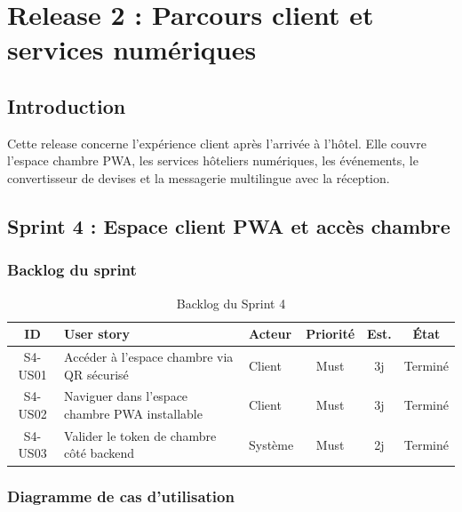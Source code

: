 \chapter{Release 2 : Parcours client et services numériques}
\label{chap:release2}
\section*{Introduction}
Cette release concerne l'expérience client après l'arrivée à l'hôtel. Elle couvre l'espace chambre PWA, les services hôteliers numériques, les événements, le convertisseur de devises et la messagerie multilingue avec la réception.

\section{Sprint 4 : Espace client PWA et accès chambre}
\label{sec:sprint4}

\subsection{Backlog du sprint}
\begin{table}[H]
\centering
\caption{Backlog du Sprint 4}
\small
\begin{tabularx}{\textwidth}{|c|X|p{2.2cm}|c|c|c|}
\hline
\textbf{ID} & \textbf{User story} & \textbf{Acteur} & \textbf{Priorité} & \textbf{Est.} & \textbf{État} \\ \hline
S4-US01 & Accéder à l'espace chambre via QR sécurisé & Client & Must & 3j & Terminé \\ \hline
S4-US02 & Naviguer dans l'espace chambre PWA installable & Client & Must & 3j & Terminé \\ \hline
S4-US03 & Valider le token de chambre côté backend & Système & Must & 2j & Terminé \\ \hline
\end{tabularx}
\end{table}

\subsection{Diagramme de cas d'utilisation}


